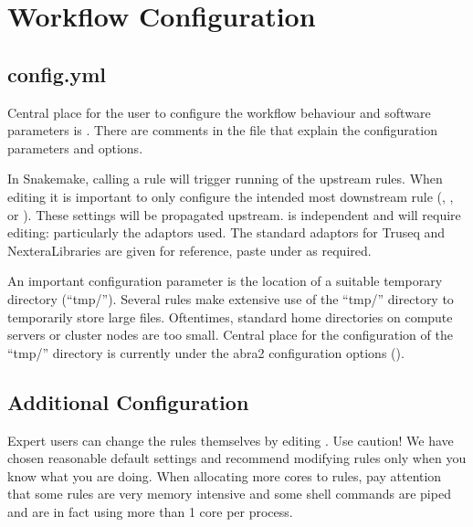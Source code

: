 \documentclass[letterpaper,10pt,english]{sphinxmanual}
\begin{document}
\section{Workflow Configuration}
\label{\detokenize{index:workflow-configuration}}

\subsection{config.yml}
\label{\detokenize{index:config-yml}}
Central place for the user to configure the workflow behaviour and software parameters is . There are comments in the file that explain the configuration parameters and options.

In Snakemake, calling a rule will trigger running of the upstream rules. When editing  it is important to only configure the intended most downstream rule (, , or ). These settings will be propagated upstream.  is independent and will require editing: particularly the  adaptors used. The standard adaptors for Truseq\sphinxhyphen{} and Nextera\sphinxhyphen{}Libraries are given for reference, paste under  as required.

An important configuration parameter is the location of a suitable temporary directory (“tmp/”). Several rules make extensive use of the “tmp/” directory to temporarily store large files. Oftentimes, standard home directories on compute servers or cluster nodes are too small. Central place for the configuration of the “tmp/” directory is currently under the abra2 configuration options ().


\subsection{Additional Configuration}
\label{\detokenize{index:additional-configuration}}
Expert users can change the rules themselves by editing . Use caution! We have chosen reasonable default settings and recommend modifying rules only when you know what you are doing. When allocating more cores to rules, pay attention that some rules are very memory intensive and some shell commands are piped and are in fact using more than 1 core per process.
\end{document}
